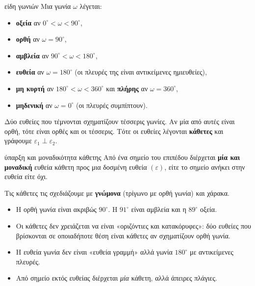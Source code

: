 \begin{orismos}{είδη γωνιών}
Μια γωνία $\omega$ λέγεται:
\begin{itemize}[leftmargin=1.2em,itemsep=0.3ex,topsep=2pt]
\item \textbf{οξεία} αν $0^\circ<\omega<90^\circ$,
\item \textbf{ορθή} αν $\omega=90^\circ$,
\item \textbf{αμβλεία} αν $90^\circ<\omega<180^\circ$,
\item \textbf{ευθεία} αν $\omega=180^\circ$ (οι πλευρές της είναι αντικείμενες ημιευθείες),
\item \textbf{μη κυρτή} αν $180^\circ<\omega<360^\circ$ και \textbf{πλήρης} αν $\omega=360^\circ$,
\item \textbf{μηδενική} αν $\omega=0^\circ$ (οι πλευρές συμπίπτουν).
\end{itemize}
\end{orismos}

\begin{center}
\end{center}


Δύο ευθείες που τέμνονται σχηματίζουν τέσσερις γωνίες. Αν μία από αυτές είναι ορθή, τότε είναι ορθές και οι τέσσερις. Τότε οι ευθείες λέγονται \textbf{κάθετες} και γράφουμε $\varepsilon_1\perp\varepsilon_2$.

\begin{idiotita}{ύπαρξη και μοναδικότητα κάθετης}
Από ένα σημείο του επιπέδου διέρχεται \textbf{μία και μοναδική} ευθεία κάθετη προς μια δοσμένη ευθεία $(\varepsilon)$, είτε το σημείο ανήκει στην ευθεία είτε όχι.
\end{idiotita}

Τις κάθετες τις σχεδιάζουμε με \textbf{γνώμονα} (τρίγωνο με ορθή γωνία) και χάρακα.

\begin{prosoxi}
\begin{itemize}[leftmargin=1.2em,itemsep=0.3ex,topsep=2pt]
\item Η ορθή γωνία είναι ακριβώς $90^\circ$. Η $91^\circ$ είναι αμβλεία και η $89^\circ$ οξεία.
\item Οι κάθετες δεν χρειάζεται να είναι «οριζόντιες και κατακόρυφες»: δύο ευθείες που βρίσκονται σε οποιαδήποτε θέση είναι κάθετες αν σχηματίζουν ορθή γωνία.
\item Η ευθεία γωνία δεν είναι «ευθεία γραμμή» αλλά γωνία $180^\circ$ με αντικείμενες πλευρές.
\item Από σημείο εκτός ευθείας διέρχεται \emph{μία} κάθετη, αλλά άπειρες πλάγιες.
\end{itemize}
\end{prosoxi}

